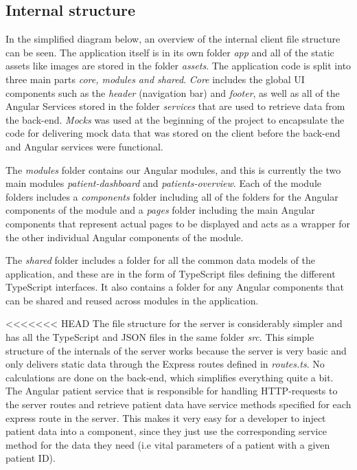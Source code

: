 \documentclass[10pt,a4paper]{article}
\begin{document}
\subsection{Internal structure}
In the simplified diagram below, an overview of the internal client file structure can be seen. The application itself is in its own folder \textit{app} and all of the static assets like images are stored in the folder \textit{assets}. The application code is split into three main parts \textit{core, modules and shared}. \textit{Core} includes the global UI components such as the \textit{header} (navigation bar) and \textit{footer}, as well as all of the Angular Services stored in the folder \textit{services} that are used to retrieve data from the back-end. \textit{Mocks} was used at the beginning of the project to encapsulate the code for delivering mock data that was stored on the client before the back-end and Angular services were functional. 

The \textit{modules} folder contains our Angular modules, and this is currently the two main modules \textit{patient-dashboard} and \textit{patients-overview}. Each of the module folders includes a \textit{components} folder including all of the folders for the Angular components of the module and a \textit{pages} folder including the main Angular components that represent actual pages to be displayed and acts as a wrapper for the other individual Angular components of the module.

The \textit{shared} folder includes a folder for all the common data models of the application, and these are in the form of TypeScript files defining the different TypeScript interfaces. It also contains a folder for any Angular components that can be shared and reused across modules in the application.

<<<<<<< HEAD
The file structure for the server is considerably simpler and has all the TypeScript and JSON files in the same folder \textit{src}. This simple structure of the internals of the server works because the server is very basic and only delivers static data through the Express routes defined in \textit{routes.ts}. No calculations are done on the back-end, which simplifies everything quite a bit. The Angular patient service that is responsible for handling HTTP-requests to the server routes and retrieve patient data have service methods specified for each express route in the server. This makes it very easy for a developer to inject patient data into a component, since they just use the corresponding service method for the data they need (i.e vital parameters of a patient with a given patient ID). 
\end{document}
